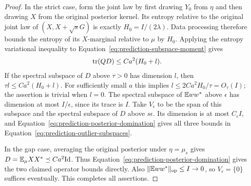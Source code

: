 \begin{proof}
In the strict case, form the joint law by first drawing $Y_0$ from
$\eta$ and then drawing $X$ from the original posterior kernel.
Its entropy relative to the original joint law of
$(X,X+\sqrt sG)$ is exactly $H_0=I/(2\lambda)$.  Data processing
therefore bounds the entropy of its $X$-marginal relative to $\mu$ by
$H_0$.  Applying the entropy variational inequality to
Equation~\eqref{eq:prediction-subspace-moment} gives
\begin{equation}
 \operatorname{tr}(QD)\le Ca^2(H_0+l).
 \label{eq:prediction-posterior-trace}
\end{equation}
If the spectral subspace of $D$ above $\tau>0$ has dimension $l$,
then $\tau l\le Ca^2(H_0+l)$.  For sufficiently small $a$ this implies
$l\le2Ca^2H_0/\tau=O_\tau(I)$; the assertion is trivial when $l=0$.
The spectral subspace of $\mathbb E ww^*$ above $\epsilon$ has dimension
at most $I/\epsilon$, since its trace is $I$.  Take $V_\epsilon$ to
be the span of this subspace and the spectral subspace of $D$ above
$s\epsilon$.  Its dimension is at most $C_\epsilon I$, and
Equation~\eqref{eq:prediction-posterior-domination} gives all three
bounds in Equation~\eqref{eq:prediction-outlier-subspaces}.

In the gap case, averaging the original posterior under
$\eta=\mu_s$ gives $D=\mathbb E_\mu XX^*\preceq Ca^2\mathrm{Id}$.  Thus
Equation~\eqref{eq:prediction-posterior-domination} gives the two
claimed operator bounds directly.  Also
$\|\mathbb E ww^*\|_{\mathrm{op}}\le I\to0$, so $V_\epsilon=\{0\}$ suffices
eventually.  This completes all assertions.
\end{proof}
